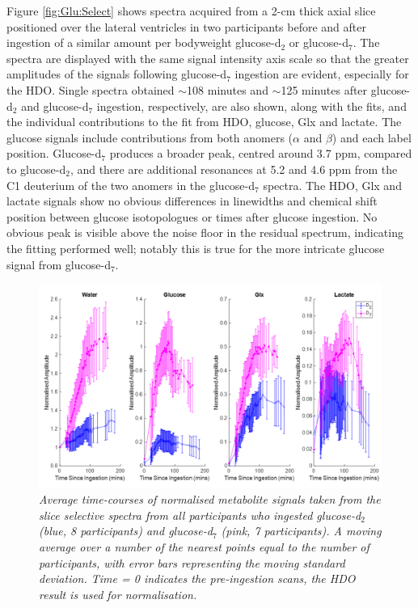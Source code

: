 Figure \ref{fig:Glu:Select} shows spectra acquired from a 2-cm thick axial slice positioned over the lateral ventricles in two participants before and after ingestion of a similar amount per bodyweight glucose-d$_2$ or glucose-d$_7$. The spectra are displayed with the same signal intensity axis scale so that the greater amplitudes of the signals following glucose-d$_7$ ingestion are evident, especially for the \ac{HDO}. Single spectra obtained $\sim$108 minutes and $\sim$125 minutes after glucose-d$_2$ and glucose-d$_7$ ingestion, respectively, are also shown, along with the fits, and the individual contributions to the fit from \ac{HDO}, glucose, Glx and lactate. The glucose signals include contributions from both anomers ($\alpha$ and $\beta$) and each label position. Glucose-d$_7$ produces a broader peak, centred around 3.7 ppm, compared to glucose-d$_2$, and there are additional resonances at 5.2 and 4.6 ppm from the C1 deuterium of the two anomers in the glucose-d$_7$ spectra. The \ac{HDO}, Glx and lactate signals show no obvious differences in linewidths and chemical shift position between glucose isotopologues or times after glucose ingestion. No obvious peak is visible above the noise floor in the residual spectrum, indicating the fitting performed well; notably this is true for the more intricate glucose signal from glucose-d$_7$.

\begin{figure}
    \centering
    \includegraphics[width = 1\textwidth]{Figures/Glucose/Bulk_Time.png}
    \caption{\textit{Average time-courses of normalised metabolite signals taken from the slice selective spectra from all participants who ingested glucose-d$_2$ (blue, 8 participants) and glucose-d$_7$ (pink, 7 participants). A moving average over a number of the nearest points equal to the number of participants, with error bars representing the moving standard deviation. Time = 0 indicates the pre-ingestion scans, the \ac{HDO} result is used for normalisation.}}
    \label{fig:Glu:Select_Time}
\end{figure}

